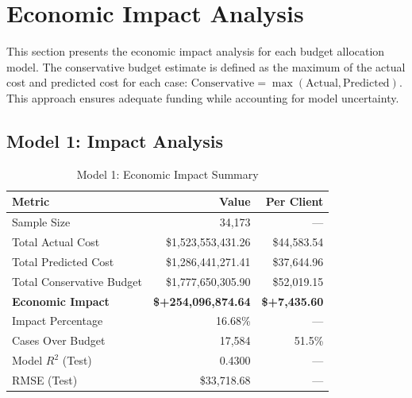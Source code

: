 
\section{Economic Impact Analysis}
\label{sec:economic_impact}

This section presents the economic impact analysis for each budget allocation model. The conservative budget estimate is defined as the maximum of the actual cost and predicted cost for each case: $\text{Conservative} = \max(\text{Actual}, \text{Predicted})$. This approach ensures adequate funding while accounting for model uncertainty.

\subsection{Model 1: Impact Analysis}
\label{subsec:model1_impact}

\begin{table}[htbp]
\centering
\small
\caption{Model 1: Economic Impact Summary}
\label{tab:model1_impact_summary}
\begin{tabular}{lrr}
\toprule
\textbf{Metric} & \textbf{Value} & \textbf{Per Client} \\
\midrule
Sample Size & 34,173 & --- \\
\midrule
Total Actual Cost & \$1,523,553,431.26 & \$44,583.54 \\
Total Predicted Cost & \$1,286,441,271.41 & \$37,644.96 \\
Total Conservative Budget & \$1,777,650,305.90 & \$52,019.15 \\
\midrule
\textbf{Economic Impact} & \textbf{\$+254,096,874.64} & \textbf{\$+7,435.60} \\
Impact Percentage & 16.68\% & --- \\
\midrule
Cases Over Budget & 17,584 & 51.5\% \\
\midrule
Model $R^2$ (Test) & 0.4300 & --- \\
RMSE (Test) & \$33,718.68 & --- \\
\bottomrule
\end{tabular}
\end{table}

